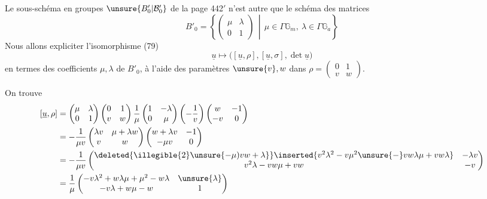 Le sous-schéma en groupes $\unsure{B'_0|\mathcal B'_0}$ de la page 442$'$ n'est autre que le schéma des matrices
\[
B'_0=\left\{\begin{pmatrix}\mu&\lambda\\0&1\end{pmatrix}
\,\middle|\,\mu\in\Gamma\mathbb G_m,\ \lambda\in\Gamma\mathbb G_a\right\} \tag{44}
\]
Nous allons expliciter l'isomorphisme (79)
\[
\underline u\longmapsto\bigl([\underline u,\rho],[\underline u,\sigma],\det\underline u\bigr) \tag{45}
\]
en termes des coefficients $\mu,\lambda$ de $B'_0$, à l'aide des paramètres
$\unsure{v},w$ dans $\rho=\begin{pmatrix}0&1\\v&w\end{pmatrix}$.


On trouve
\[
\begin{aligned}
{}[\underline u,\rho]
&=\begin{pmatrix}\mu&\lambda\\0&1\end{pmatrix}
\begin{pmatrix}0&1\\v&w\end{pmatrix}
\frac1\mu\begin{pmatrix}1&-\lambda\\0&\mu\end{pmatrix}
\left(-\frac1v\right)\begin{pmatrix}w&-1\\-v&0\end{pmatrix}\\
&=-\frac1{\mu v}\begin{pmatrix}\lambda v&\mu+\lambda w\\v&w\end{pmatrix}
\begin{pmatrix}w+\lambda v&-1\\-\mu v&0\end{pmatrix}\\
&=-\frac1{\mu v}
\begin{pmatrix}
\deleted{\illegible{2}\unsure{-\mu)vw+\lambda}}\inserted{v^2\lambda^2-v\mu^2\unsure{-}vw\lambda\mu+vw\lambda}&-\lambda v\\
v^2\lambda-vw\mu+vw&-v
\end{pmatrix}\\
&=\frac1\mu\begin{pmatrix}
-v\lambda^2+w\lambda\mu+\mu^2-w\lambda&\unsure{\lambda}\\
-v\lambda+w\mu-w&1
\end{pmatrix}
\end{aligned}
\]

